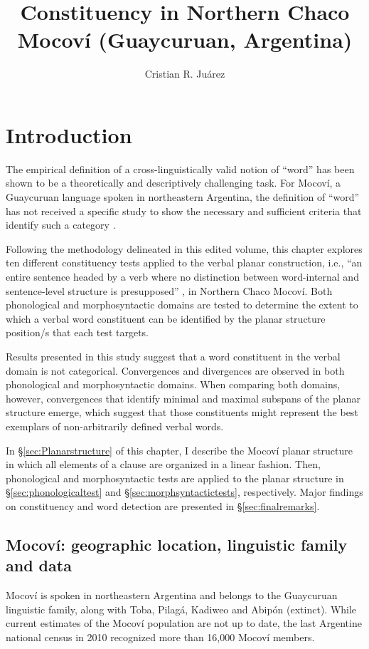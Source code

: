\documentclass[output=paper]{langscibook}
\author{Cristian R. Juárez\affiliation{The University of Texas at Austin}}
\title{Constituency in Northern Chaco Mocoví (Guaycuruan, Argentina)}
\begin{document}
\maketitle

\section{Introduction}
The empirical definition of a cross-linguistically valid notion of ``word'' has been shown to be a theoretically and descriptively challenging task. For Mocoví, a Guaycuruan language spoken in northeastern Argentina, the definition of ``word'' has not received a specific study to show the necessary and sufficient criteria that identify such a category \citep[cf.][]{Carrio2009,Gualdieri1998,Grondona1998}.

Following the methodology delineated in this edited volume, this chapter explores ten different constituency tests applied to the verbal planar construction, i.e., ``an entire sentence headed by a verb where no distinction between word-internal and sentence-level structure is presupposed'' \citep[][52--53]{Tallman2020}, in Northern Chaco Mocoví. Both phonological and morphosyntactic domains are tested to determine the extent to which a verbal word constituent can be identified by the planar structure position/s that each test targets. 

Results presented in this study suggest that a word constituent in the verbal domain is not categorical. Convergences and divergences are observed in both phonological and morphosyntactic domains. When comparing both domains, however, convergences that identify minimal and maximal subspans of the planar structure emerge, which suggest that those constituents might represent the best exemplars of non-arbitrarily defined verbal words.   

In \S \ref{sec:Planarstructure} of this chapter, I describe the Mocoví planar structure in which all elements of a clause are organized in a linear fashion. Then, phonological and morphosyntactic tests are applied to the planar structure in \S \ref{sec:phonologicaltest} and \S\ref{sec:morphsyntactictests}, respectively. Major findings on constituency and word detection are presented in \S \ref{sec:finalremarks}. 


\subsection{Mocoví: geographic location, linguistic family and data}
Mocoví is spoken in northeastern Argentina and belongs to the Guaycuruan linguistic family, along with Toba, Pilagá, Kadiweo and Abipón (extinct). While current estimates of the Mocoví population are not up to date, the last Argentine national census in 2010 recognized more than 16,000 Mocoví members. 
\end{document}

